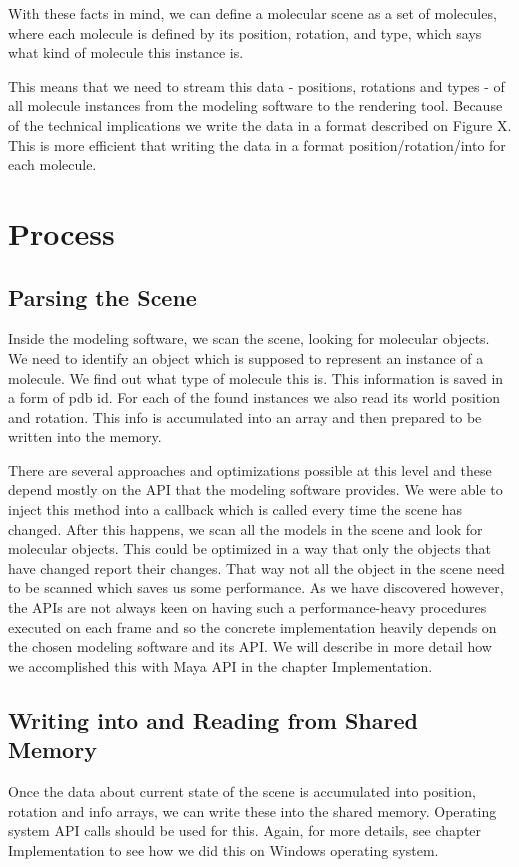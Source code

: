 \documentclass[
  digital, %
  table,   %
  nolof,     %
  nolot,     %
]{fithesis3}
\begin{document}
With these facts in mind, we can define a molecular scene as a set of molecules, where each molecule is defined by its position, rotation, and type, which says what kind of molecule this instance is.

This means that we need to stream this data - positions, rotations and types - of all molecule instances from the modeling software to the rendering tool. Because of the technical implications we write the data in a format described on Figure X. This is more efficient that writing the data in a format position/rotation/into for each molecule.
\section{Process}
\subsection{Parsing the Scene}
Inside the modeling software, we scan the scene, looking for molecular objects. We need to identify an object which is supposed to represent an instance of a molecule. We find out what type of molecule this is. This information is saved in a form of pdb id. For each of the found instances we also read its world position and rotation. This info is accumulated into an array and then prepared to be written into the memory.

There are several approaches and optimizations possible at this level and these depend mostly on the API that the modeling software provides. We were able to inject this method into a callback which is called every time the scene has changed. After this happens, we scan all the models in the scene and look for molecular objects. This could be optimized in a way that only the objects that have changed report their changes. That way not all the object in the scene need to be scanned which saves us some performance. As we have discovered however, the APIs are not always keen on having such a performance-heavy procedures executed on each frame and so the concrete implementation heavily depends on the chosen modeling software and its API. We will describe in more detail how we accomplished this with Maya API in the chapter Implementation.

\subsection{Writing into and Reading from Shared Memory}
Once the data about current state of the scene is accumulated into position, rotation and info arrays, we can write these into the shared memory. Operating system API calls should be used for this. Again, for more details, see chapter Implementation to see how we did this on Windows operating system.
\end{document}
